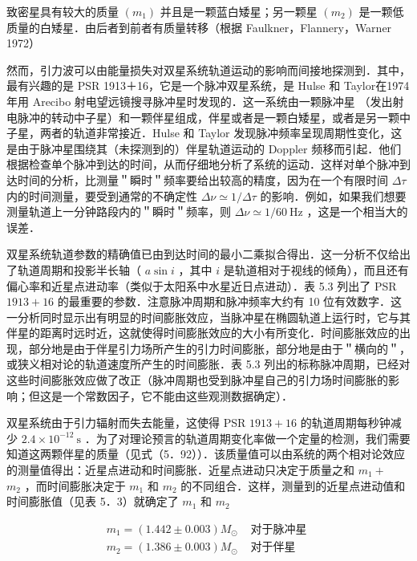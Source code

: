 致密星具有较大的质量 $\left(m_{1}\right)$ 并且是一颗蓝白矮星；另一颗星 $\left(m_{2}\right)$ 是一颗低质量的白矮星．由后者到前者有质量转移（根据 Faulkner，Flannery，Warner 1972）

然而，引力波可以由能量损失对双星系统轨道运动的影响而间接地探测到．其中，最有兴趣的是 PSR 1913＋16，它是一个脉冲双星系统，是 Hulse 和 Taylor在1974年用 Arecibo 射电望远镜搜寻脉冲星时发现的．这一系统由一颗脉冲星 （发出射电脉冲的转动中子星）和一颗伴星组成，伴星或者是一颗白矮星，或者是另一颗中子星，两者的轨道非常接近．Hulse 和 Taylor 发现脉冲频率呈现周期性变化，这是由于脉冲星围绕其（未探测到的）伴星轨道运动的 Doppler 频移而引起．他们根据检查单个脉冲到达的时间，从而仔细地分析了系统的运动．这样对单个脉冲到达时间的分析，比测量＂瞬时＂频率要给出较高的精度，因为在一个有限时间 $\Delta \tau$ 内的时间测量，要受到通常的不确定性 $\Delta \nu \simeq 1 / \Delta \tau$ 的影响．例如，如果我们想要测量轨道上一分钟路段内的＂瞬时＂频率，则 $\Delta \nu \simeq 1 / 60 \mathrm{~Hz}$ ，这是一个相当大的误差．

双星系统轨道参数的精确值已由到达时间的最小二乘拟合得出．这一分析不仅给出了轨道周期和投影半长轴（ $a \sin i$ ，其中 $i$ 是轨道相对于视线的倾角），而且还有偏心率和近星点进动率（类似于太阳系中水星近日点进动）．表 5.3 列出了 PSR $1913+16$ 的最重要的参数．注意脉冲周期和脉冲频率大约有 10 位有效数字．这一分析同时显示出有明显的时间膨胀效应，当脉冲星在椭圆轨道上运行时，它与其伴星的距离时远时近，这就使得时间膨胀效应的大小有所变化．时间膨胀效应的出现，部分地是由于伴星引力场所产生的引力时间膨胀，部分地是由于＂横向的＂，或狭义相对论的轨道速度所产生的时间膨胀．表 5.3 列出的标称脉冲周期，已经对这些时间膨胀效应做了改正（脉冲周期也受到脉冲星自己的引力场时间膨胀的影响；但这是一个常数因子，它不能由这些观测数据确定）．

双星系统由于引力辐射而失去能量，这使得 PSR $1913+16$ 的轨道周期每秒钟减少 $2.4 \times 10^{-12} \mathrm{~s}$ ．为了对理论预言的轨道周期变化率做一个定量的检测，我们需要知道这两颗伴星的质量（见式（5．92））．该质量值可以由系统的两个相对论效应的测量值得出：近星点进动和时间膨胀．近星点进动只决定于质量之和 $m_{1}+$\\
$m_{2}$ ，而时间膨胀决定于 $m_{1}$ 和 $m_{2}$ 的不同组合．这样，测量到的近星点进动值和时间膨胀值（见表 5．3）就确定了 $m_{1}$ 和 $m_{2}$

\[
\begin{array}{cc}
	m_{1}=(1.442 \pm 0.003) M_{\odot} & \text { 对于脉冲星 } \\
	m_{2}=(1.386 \pm 0.003) M_{\odot} & \text { 对于伴星 } \tag{5.93}
\end{array}
\]

